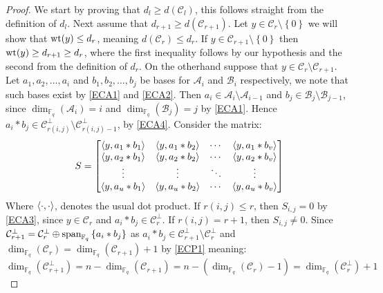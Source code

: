 \begin{proof}
  We start by proving that $d_l \geq d(\mathcal{C}_l)$, this follows straight from the definition of $d_l$. Next assume that $d_{r + 1} \geq d(\mathcal{C}_{r + 1})$. Let $y \in \mathcal{C}_r \setminus \left\{0\right\}$ we will show that $\mathrm{wt}(y) \leq d_r$, meaning $d(\mathcal{C}_r) \leq d_r$. If $y \in \mathcal{C}_{r + 1} \setminus \left\{0\right\}$ then $\mathrm{wt}(y) \geq d_{r + 1} \geq d_r$, where the first inequality follows by our hypothesis and the second from the definition of $d_{r}$. On the otherhand suppose that $y \in \mathcal{C}_r \setminus \mathcal{C}_{r + 1}$.
  Let $a_1, a_2, \ldots, a_{i}$ and $b_1, b_2, \ldots, b_{j}$ be bases for $\mathcal{A}_i$ and $\mathcal{B}_i$ respectively, we note that such bases exist by \ref{ECA1} and \ref{ECA2}. Then $a_i \in \mathcal{A}_i \setminus \mathcal{A}_{i - 1}$ and $b_j \in \mathcal{B}_j \setminus \mathcal{B}_{j - 1}$, since $\dim_{\mathbb{F}_q} (\mathcal{A}_i) = i$ and $\dim_{\mathbb{F}_q} (\mathcal{B}_j) = j$ by \ref{ECA1}. Hence $a_i * b_j \in \mathcal{C}_{r(i, j)}^{\perp} \setminus \mathcal{C}_{r(i, j) -1}^{\perp}$, by \ref{ECA4}.
  Consider the matrix:
  \begin{equation*}
    S = \begin{bmatrix}
         \langle y, a_1 * b_1\rangle & \langle y, a_1 * b_2\rangle & \cdots & \langle y, a_1 * b_{v}\rangle\\
         \langle y, a_2 * b_1\rangle & \langle y, a_2 * b_2\rangle & \cdots & \langle y, a_2 * b_{v}\rangle\\
          \vdots & \vdots & \ddots & \vdots \\
         \langle y, a_u * b_1\rangle & \langle y, a_u * b_2\rangle & \cdots & \langle y, a_u * b_{v}\rangle
        \end{bmatrix}
  \end{equation*}
  Where $\langle\cdot, \cdot\rangle$, denotes the usual dot product. If $r(i, j) \leq r$, then $S_{i, j} = 0$ by \ref{ECA3}, since $y \in \mathcal{C}_r$ and $a_i * b_j \in \mathcal{C}_r^{\perp}$.
  If $r(i, j) = r + 1$, then $S_{i,j} \neq 0$. Since $\mathcal{C}_{r + 1}^{\perp} = \mathcal{C}_r^{\perp} \oplus \textnormal{span}_{\mathbb{F}_q}\left\{a_i * b_j\right\}$ as $a_i * b_j \in \mathcal{C}_{r + 1}^{\perp} \setminus \mathcal{C}_r^{\perp}$ and $\dim_{\mathbb{F}_q}(\mathcal{C}_r) = \dim_{\mathbb{F}_q}(\mathcal{C}_{r + 1}) + 1$ by \ref{ECP1} meaning:
  \begin{equation*}
  \dim_{\mathbb{F}_q}(\mathcal{C}_{r + 1}^{\perp}) = n - \dim_{\mathbb{F}_q}(\mathcal{C}_{r + 1}) = n - (\dim_{\mathbb{F}_q}(\mathcal{C}_{r}) - 1) = \dim_{\mathbb{F}_q}(\mathcal{C}_r^{\perp}) + 1

\end{equation*}
\end{proof}
